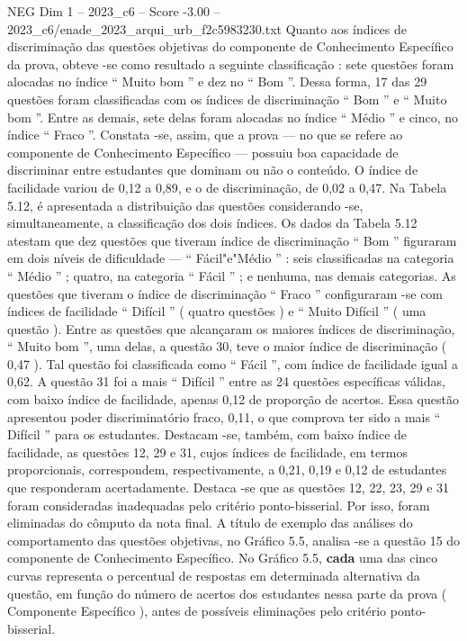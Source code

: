 \begin{textsample}{NEG Dim 1 – 2023\_c6 – Score -3.00 – 2023\_c6/enade\_2023\_arqui\_urb\_f2c5983230.txt}
Quanto aos índices de discriminação das questões objetivas do componente de Conhecimento Específico da prova, obteve -se como resultado a seguinte classificação : sete questões foram alocadas no índice “ Muito bom ” e dez no “ Bom ”.
Dessa forma, 17 das 29 questões foram classificadas com os índices de discriminação “ Bom ” e “ Muito bom ”.
Entre as demais, sete delas foram alocadas no índice “ Médio ” e cinco, no índice “ Fraco ”.
Constata -se, assim, que a prova — no que se refere ao componente de Conhecimento Específico — possuiu boa capacidade de discriminar entre estudantes que dominam ou não o conteúdo.
O índice de facilidade variou de 0,12 a 0,89, e o de discriminação, de 0,02 a 0,47.
Na Tabela 5.12, é apresentada a distribuição das questões considerando -se, simultaneamente, a classificação dos dois índices.
Os dados da Tabela 5.12 atestam que dez questões que tiveram índice de discriminação “ Bom ” figuraram em dois níveis de dificuldade — “ Fácil"e"Médio ” : seis classificadas na categoria “ Médio ” ; quatro, na categoria “ Fácil ” ; e nenhuma, nas demais categorias.
As questões que tiveram o índice de discriminação “ Fraco ” configuraram -se com índices de facilidade “ Difícil ” ( quatro questões ) e “ Muito Difícil ” ( uma questão ).
Entre as questões que alcançaram os maiores índices de discriminação, “ Muito bom ”, uma delas, a questão 30, teve o maior índice de discriminação ( 0,47 ).
Tal questão foi classificada como “ Fácil ”, com índice de facilidade igual a 0,62.
A questão 31 foi a mais “ Difícil ” entre as 24 questões específicas válidas, com baixo índice de facilidade, apenas 0,12 de proporção de acertos.
Essa questão apresentou poder discriminatório fraco, 0,11, o que comprova ter sido a mais “ Difícil ” para os estudantes.
Destacam -se, também, com baixo índice de facilidade, as questões 12, 29 e 31, cujos índices de facilidade, em termos proporcionais, correspondem, respectivamente, a 0,21, 0,19 e 0,12 de estudantes que responderam acertadamente.
Destaca -se que as questões 12, 22, 23, 29 e 31 foram consideradas inadequadas pelo critério ponto-bisserial.
Por isso, foram eliminadas do cômputo da nota final.
A título de exemplo das análises do comportamento das questões objetivas, no Gráfico 5.5, analisa -se a questão 15 do componente de Conhecimento Específico.
No Gráfico 5.5, \textbf{cada} uma das cinco curvas representa o percentual de respostas em determinada alternativa da questão, em função do número de acertos dos estudantes nessa parte da prova ( Componente Específico ), antes de possíveis eliminações pelo critério ponto-bisserial.

\end{textsample}
